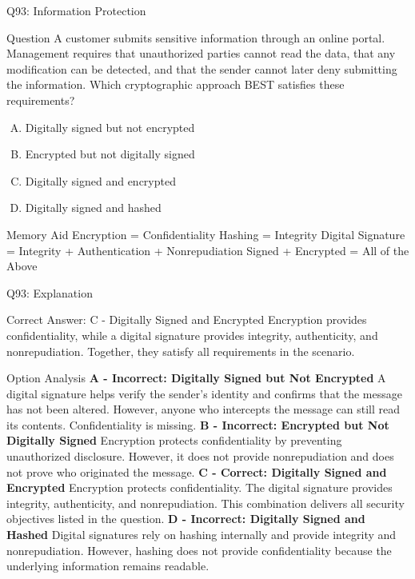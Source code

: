 \documentclass{beamer}
\begin{document}
	
	\begin{frame}{Q93: Information Protection} \begin{block}{Question} A customer submits sensitive information through an online portal. Management requires that unauthorized parties cannot read the data, that any modification can be detected, and that the sender cannot later deny submitting the information. Which cryptographic approach BEST satisfies these requirements? \end{block} \begin{enumerate}[(A)] \item Digitally signed but not encrypted \item Encrypted but not digitally signed \item Digitally signed and encrypted \item Digitally signed and hashed \end{enumerate} \begin{block}{Memory Aid} Encryption = Confidentiality Hashing = Integrity Digital Signature = Integrity + Authentication + Nonrepudiation Signed + Encrypted = All of the Above \end{block}  \end{frame} \begin{frame}[shrink=10]{Q93: Explanation} \footnotesize \begin{block}{Correct Answer: C - Digitally Signed and Encrypted} Encryption provides confidentiality, while a digital signature provides integrity, authenticity, and nonrepudiation. Together, they satisfy all requirements in the scenario. \end{block} \begin{block}{Option Analysis} \textbf{A - Incorrect: Digitally Signed but Not Encrypted} A digital signature helps verify the sender's identity and confirms that the message has not been altered. However, anyone who intercepts the message can still read its contents. Confidentiality is missing. \vspace{0.15cm} \textbf{B - Incorrect: Encrypted but Not Digitally Signed} Encryption protects confidentiality by preventing unauthorized disclosure. However, it does not provide nonrepudiation and does not prove who originated the message. \vspace{0.15cm} \textbf{C - Correct: Digitally Signed and Encrypted} Encryption protects confidentiality. The digital signature provides integrity, authenticity, and nonrepudiation. This combination delivers all security objectives listed in the question. \vspace{0.15cm} \textbf{D - Incorrect: Digitally Signed and Hashed} Digital signatures rely on hashing internally and provide integrity and nonrepudiation. However, hashing does not provide confidentiality because the underlying information remains readable. \end{block} \end{frame}
	
\end{document}
